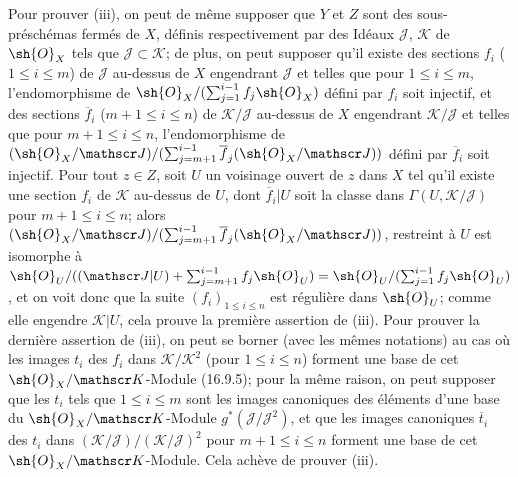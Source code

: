 Pour prouver (iii), on peut de même supposer que $Y$ et $Z$ sont des sous-préschémas fermés de $X$, définis respectivement par des Idéaux $\mathscr J$, $\mathscr K$ de $\sh{O}_X$ tels que $\mathscr J\subset\mathscr K$; de plus, on peut supposer qu'il existe des sections $f_i$ ($1\leq i\leq m$) de $\mathscr J$ au-dessus de $X$ engendrant $\mathscr J$ et telles que pour $1\leq i\leq m$, l'endomorphisme de $\sh{O}_X/(\sum_{j=1}^{i-1}f_j\sh{O}_X)$ défini par $f_i$ soit injectif, et des sections $\overline f_i$ ($m+1\leq i\leq n$) de $\mathscr K/\mathscr J$ au-dessus de $X$ engendrant $\mathscr K/\mathscr J$ et telles que pour $m+1\leq i\leq n$, l'endomorphisme de $(\sh{O}_X/\mathscr J)/(\sum_{j=m+1}^{i-1}\overline f_j(\sh{O}_X/\mathscr J))$ défini par $\overline f_i$ soit injectif. Pour tout $z\in Z$, soit $U$ un voisinage ouvert de $z$ dans $X$ tel qu'il existe une section $f_i$ de $\mathscr K$ au-dessus de $U$, dont $\overline f_i|U$ soit la classe dans $\Gamma(U,\mathscr K/\mathscr J)$ pour $m+1\leq i\leq n$; alors $(\sh{O}_X/\mathscr J)/(\sum_{j=m+1}^{i-1}\overline f_j(\sh{O}_X/\mathscr J))$, restreint à $U$ est isomorphe à $\sh{O}_U/((\mathscr J|U)+\sum_{j=m+1}^{i-1}f_j\sh{O}_U)=\sh{O}_U/(\sum_{j=1}^{i-1}f_j\sh{O}_U)$, et on voit donc que la suite $(f_i)_{1\leq i\leq n}$ est régulière dans $\sh{O}_U$; comme elle engendre $\mathscr K|U$, cela prouve la première assertion de (iii). Pour prouver la dernière assertion de (iii), on peut se borner (avec les mêmes notations) au cas où les images $t_i$ des $f_i$ dans $\mathscr K/\mathscr K^2$ (pour $1\leq i\leq n$) forment une base de cet $\sh{O}_X/\mathscr K$-Module (16.9.5); pour la même raison, on peut supposer que les $t_i$ tels que $1\leq i\leq m$ sont les images canoniques des éléments d'une base du $\sh{O}_X/\mathscr K$-Module $g^*(\mathscr J/\mathscr J^2)$, et que les images canoniques $\overline t_i$ des $t_i$ dans $(\mathscr K/\mathscr J)/(\mathscr K/\mathscr J)^2$ pour $m+1\leq i\leq n$ forment une base de cet $\sh{O}_X/\mathscr K$-Module. Cela achève de prouver (iii).

